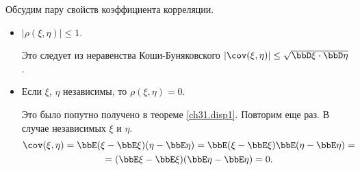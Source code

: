 Обсудим пару свойств коэффициента корреляции.
\begin{itemize}
\item 
$|\rho(\xi,\eta)|\le1$.

Это следует из неравенства Коши-Буняковского $|\cov(\xi,\eta)| \le \sqrt{\bbD\xi\cdot \bbD\eta}$.
\item
Если $\xi$, $\eta$ независимы, то $\rho(\xi,\eta)=0$.

Это было попутно получено в теореме \ref{ch31.disp1}. Повторим еще раз. В случае независимых $\xi$ и $\eta$.
\begin{multline*}
\cov(\xi,\eta)=\bbE(\xi - \bbE\xi)(\eta - \bbE\eta) = \bbE(\xi - \bbE\xi)\bbE(\eta - \bbE\eta)=\\ = (\bbE\xi - \bbE\xi)(\bbE\eta - \bbE\eta) = 0.
\end{multline*}
\end{itemize}
